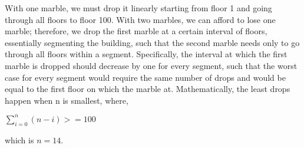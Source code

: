 \documentclass{article}
\begin{document}
\begin{enumerate}
    With one marble, we must drop it linearly starting from floor 1 and going through all floors to floor 100. With two marbles, we can afford to lose one marble; therefore, we drop the first marble at a certain interval of floors, essentially segmenting the building, such that the second marble needs only to go through all floors within a segment. Specifically, the interval at which the first marble is dropped should decrease by one for every segment, such that the worst case for every segment would require the same number of drops and would be equal to the first floor on which the marble at. Mathematically, the least drops happen when n is smallest, where,
    
    \(\sum^n_{i=0}(n-i) >= 100\)

    which is $ n = 14$.
    
\end{enumerate}
\end{document}
